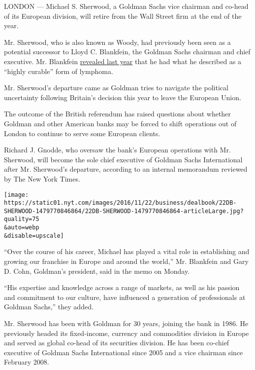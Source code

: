 LONDON --- Michael S. Sherwood, a Goldman Sachs vice chairman and
co-head of its European division, will retire from the Wall Street firm
at the end of the year.

Mr. Sherwood, who is also known as Woody, had previously been seen as a
potential successor to Lloyd C. Blankfein, the Goldman Sachs chairman
and chief executive. Mr. Blankfein
\href{http://www.nytimes.com/2015/09/23/business/dealbook/goldman-ceo-lloyd-blankfein-has-lymphoma.html?rref=collection\%2Ftimestopic\%2FBlankfein\%2C\%20Lloyd\%20C.\&action=click\&contentCollection=timestopics\&region=stream\&module=stream_unit\&version=latest\&contentPlacement=8\&pgtype=collection}{revealed
last year} that he had what he described as a ``highly curable'' form of
lymphoma.

Mr. Sherwood's departure came as Goldman tries to navigate the political
uncertainty following Britain's decision this year to leave the European
Union.

The outcome of the British referendum has raised questions about whether
Goldman and other American banks may be forced to shift operations out
of London to continue to serve some European clients.

Richard J. Gnodde, who oversaw the bank's European operations with Mr.
Sherwood, will become the sole chief executive of Goldman Sachs
International after Mr. Sherwood's departure, according to an internal
memorandum reviewed by The New York Times.

\texttt{[image: https://static01.nyt.com/images/2016/11/22/business/dealbook/22DB-SHERWOOD-1479770846864/22DB-SHERWOOD-1479770846864-articleLarge.jpg?quality=75\\\&auto=webp\\\&disable=upscale]}

``Over the course of his career, Michael has played a vital role in
establishing and growing our franchise in Europe and around the world,''
Mr. Blankfein and Gary D. Cohn, Goldman's president, said in the memo on
Monday.

``His expertise and knowledge across a range of markets, as well as his
passion and commitment to our culture, have influenced a generation of
professionals at Goldman Sachs,'' they added.

Mr. Sherwood has been with Goldman for 30 years, joining the bank in
1986. He previously headed its fixed-income, currency and commodities
division in Europe and served as global co-head of its securities
division. He has been co-chief executive of Goldman Sachs International
since 2005 and a vice chairman since February 2008.

